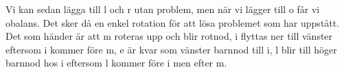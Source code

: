 \documentclass[a5paper,10pt,oneside]{article}
\begin{document}
Vi kan sedan lägga till l och r utan problem, men när vi lägger till o får vi obalans. Det sker då en enkel rotation för att lösa problemet som har uppstått. Det som händer är att m roteras upp och blir rotnod, i flyttas ner till vänster eftersom i kommer före m, e är kvar som vänster barnnod till i, l blir till höger barnnod hos i eftersom l kommer före i men efter m. 
\end{document}
